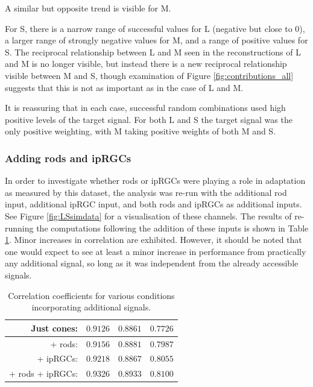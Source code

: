 A similar but opposite trend is visible for M.

For S, there is a narrow range of successful values for L (negative but close to 0), a larger range of strongly negative values for M, and a range of positive values for S. The reciprocal relationship between L and M seen in the reconstructions of L and M is no longer visible, but instead there is a new reciprocal relationship visible between M and S, though examination of Figure \ref{fig:contributions_all} suggests that this is not as important as in the case of L and M.

It is reassuring that in each case, successful random combinations used high positive levels of the target signal. For both L and S the target signal was the only positive weighting, with M taking positive weights of both M and S. 

\subsubsection{Adding rods and ipRGCs}

In order to investigate whether rods or \glspl{ipRGC} were playing a role in adaptation as measured by this dataset, the analysis was re-run with the additional rod input, additional \gls{ipRGC} input, and both rods and \glspl{ipRGC} as additional inputs. See Figure \ref{fig:LSsimdata} for a visualisation of these channels. The results of re-running the computations following the addition of these inputs is shown in Table \ref{tab:plusres}. Minor increases in correlation are exhibited. However, it should be noted that one would expect to see at least a minor increase in performance from practically any additional signal, so long as it was independent from the already accessible signals.

\begin{table}[hbtp]
\centering
\begin{tabular}{|r|r|r|r|}
\hline
Just cones: & $0.9126$ & $0.8861$ & $0.7726$ \\ \hline
+ rods: & $0.9156$ & $0.8881$ & $0.7987$ \\ \hline
+ ipRGCs: & $0.9218$ & $0.8867$ & $0.8055$ \\ \hline
+ rods + ipRGCs: & $0.9326$ & $0.8933$ &$0.8100$ \\ \hline
\end{tabular} %
\caption{Correlation coefficients for various conditions incorporating additional signals.}
\label{tab:plusres}
\end{table}

